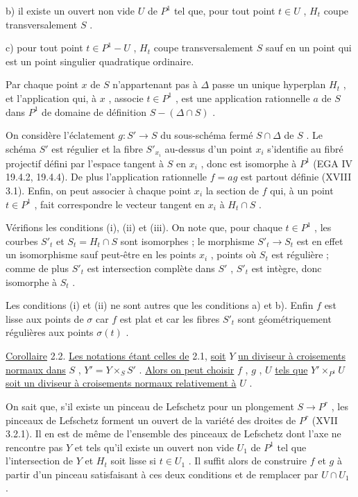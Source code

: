 b) il existe un ouvert non vide  $U$  de  $P^1$  tel que, pour tout point  $t \in U$ , $H_t$  coupe transversalement  $S$ .

c) pour tout point  $t \in P^1-U$ , $H_t$  coupe transversalement  $S$  sauf en un point qui est un point singulier quadratique ordinaire.

Par chaque point  $x$  de  $S$  n'appartenant pas à  $\Delta$  passe un unique hyperplan  $H_t$ , et l'application qui, à  $x$ , associe  $t \in P^1$ , est une application rationnelle  $a$  de  $S$  dans  $P^1$  de domaine de définition  $S-(\Delta \cap S)$ .

On considère l'éclatement  $g : S' \longrightarrow S$  du sous-schéma fermé  $S \cap \Delta$  de  $S$ . Le schéma  $S'$  est régulier et la fibre  $S'_{x_i}$  au-dessus d'un point  $x_i$  s'identifie au fibré projectif défini par l'espace tangent à  $S$  en  $x_i$ , donc est isomorphe à  $P^1$  (EGA IV 19.4.2, 19.4.4). De plus l'application rationnelle  $f = ag$  est partout définie (XVIII 3.1). Enfin, on peut associer à chaque point  $x_i$  la section de  $f$  qui, à un point  $t \in P^1$ , fait correspondre le vecteur tangent en  $x_i$  à  $H_t \cap S$ .

Vérifions les conditions (i), (ii) et (iii). On note que, pour chaque  $t \in P^1$ , les courbes  $S'_t$  et  $S_t = H_t \cap S$  sont isomorphes ; le morphisme  $S'_t \longrightarrow S_t$  est en effet un isomorphisme sauf peut-être en les points  $x_i$ , points où  $S_t$  est régulière ; comme de plus  $S'_t$  est intersection complète dans  $S'$ , $S'_t$  est intègre, donc isomorphe à  $S_t$ .

Les conditions (i) et (ii) ne sont autres que les conditions a) et b). Enfin  $f$  est lisse aux points de  $\sigma$  car  $f$  est plat et car les fibres  $S'_t$  sont géométriquement régulières aux points  $\sigma(t)$ .



\underline{Corollaire} 2.2. \underline{Les notations étant celles de} 2.1, \underline{soit} $Y$ \underline{un diviseur à croisements normaux dans} $S$ , $Y' = Y \times_S S'$ . \underline{Alors on peut choisir} $f$ , $g$ , $U$ \underline{tels que} $Y'\times_{P^1}U$ \underline{soit un diviseur à croisements normaux relativement à} $U$ .

On sait que, s'il existe un pinceau de Lefschetz pour un plongement $S \longrightarrow P^r$ , les pinceaux de Lefschetz forment un ouvert de la variété des droites de $P^r$ (XVII 3.2.1). Il en est de même de l'ensemble des pinceaux de Lefschetz dont l'axe ne rencontre pas $Y$ et tels qu'il existe un ouvert non vide $U_1$ de $P^1$ tel que l'intersection de $Y$ et $H_t$ soit lisse si $t \in U_1$ . Il suffit alors de construire $f$ et $g$ à partir d'un pinceau satisfaisant à ces deux conditions et de remplacer par $U \cap U_1$ .

